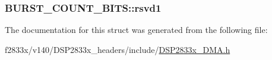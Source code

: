\subsubsection[{rsvd1}]{ B\+U\+R\+S\+T\+\_\+\+C\+O\+U\+N\+T\+\_\+\+B\+I\+T\+S\+::rsvd1}\label{struct_b_u_r_s_t___c_o_u_n_t___b_i_t_s_ae9c02ec4a830e742326b8a60c99f5740}


The documentation for this struct was generated from the following file\+:\begin{DoxyCompactItemize}
\item 
f2833x/v140/\+D\+S\+P2833x\+\_\+headers/include/\hyperlink{_d_s_p2833x___d_m_a_8h}{D\+S\+P2833x\+\_\+\+D\+M\+A.\+h}\end{DoxyCompactItemize}
